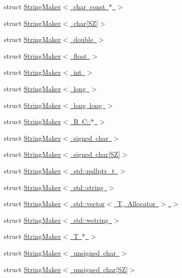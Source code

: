 \begin{DoxyCompactItemize}
\item 
struct \mbox{\hyperlink{structCatch_1_1StringMaker_3_01char_01const_01_5_01_4}{String\+Maker$<$ char const $\ast$ $>$}}
\item 
struct \mbox{\hyperlink{structCatch_1_1StringMaker_3_01char[SZ]_4}{String\+Maker$<$ char\mbox{[}\+S\+Z\mbox{]}$>$}}
\item 
struct \mbox{\hyperlink{structCatch_1_1StringMaker_3_01double_01_4}{String\+Maker$<$ double $>$}}
\item 
struct \mbox{\hyperlink{structCatch_1_1StringMaker_3_01float_01_4}{String\+Maker$<$ float $>$}}
\item 
struct \mbox{\hyperlink{structCatch_1_1StringMaker_3_01int_01_4}{String\+Maker$<$ int $>$}}
\item 
struct \mbox{\hyperlink{structCatch_1_1StringMaker_3_01long_01_4}{String\+Maker$<$ long $>$}}
\item 
struct \mbox{\hyperlink{structCatch_1_1StringMaker_3_01long_01long_01_4}{String\+Maker$<$ long long $>$}}
\item 
struct \mbox{\hyperlink{structCatch_1_1StringMaker_3_01R_01C_1_1_5_01_4}{String\+Maker$<$ R C\+::$\ast$ $>$}}
\item 
struct \mbox{\hyperlink{structCatch_1_1StringMaker_3_01signed_01char_01_4}{String\+Maker$<$ signed char $>$}}
\item 
struct \mbox{\hyperlink{structCatch_1_1StringMaker_3_01signed_01char[SZ]_4}{String\+Maker$<$ signed char\mbox{[}\+S\+Z\mbox{]}$>$}}
\item 
struct \mbox{\hyperlink{structCatch_1_1StringMaker_3_01std_1_1nullptr__t_01_4}{String\+Maker$<$ std\+::nullptr\+\_\+t $>$}}
\item 
struct \mbox{\hyperlink{structCatch_1_1StringMaker_3_01std_1_1string_01_4}{String\+Maker$<$ std\+::string $>$}}
\item 
struct \mbox{\hyperlink{structCatch_1_1StringMaker_3_01std_1_1vector_3_01T_00_01Allocator_01_4_01_4}{String\+Maker$<$ std\+::vector$<$ T, Allocator $>$ $>$}}
\item 
struct \mbox{\hyperlink{structCatch_1_1StringMaker_3_01std_1_1wstring_01_4}{String\+Maker$<$ std\+::wstring $>$}}
\item 
struct \mbox{\hyperlink{structCatch_1_1StringMaker_3_01T_01_5_01_4}{String\+Maker$<$ T $\ast$ $>$}}
\item 
struct \mbox{\hyperlink{structCatch_1_1StringMaker_3_01unsigned_01char_01_4}{String\+Maker$<$ unsigned char $>$}}
\item 
struct \mbox{\hyperlink{structCatch_1_1StringMaker_3_01unsigned_01char[SZ]_4}{String\+Maker$<$ unsigned char\mbox{[}\+S\+Z\mbox{]}$>$}}

\end{DoxyCompactItemize}
